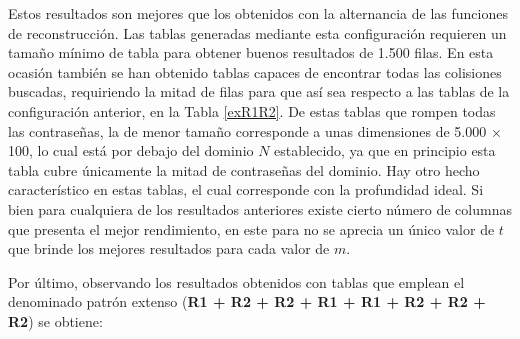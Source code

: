 \documentclass[12pt,spanish,listoffigures,listoftables,listofalgorithms]{tfgetsinf}
\begin{document}
Estos resultados son mejores que los obtenidos con la alternancia de las funciones de reconstrucción. Las tablas generadas mediante esta configuración requieren un tamaño mínimo de tabla para obtener buenos resultados de 1.500 filas. En esta ocasión también se han obtenido tablas capaces de encontrar todas las colisiones buscadas, requiriendo la mitad de filas para que así sea respecto a las tablas de la configuración anterior, en la Tabla \ref{exR1R2}. De estas tablas que rompen todas las contraseñas, la de menor tamaño corresponde a unas dimensiones de 5.000 $\times$ 100, lo cual está por debajo del dominio $N$ establecido, ya que en principio esta tabla cubre únicamente la mitad de contraseñas del dominio. Hay otro hecho característico en estas tablas, el cual corresponde con la profundidad ideal. Si bien para cualquiera de los resultados anteriores existe cierto número de columnas que presenta el mejor rendimiento, en este para no se aprecia un único valor de $t$ que brinde los mejores resultados para cada valor de $m$.

Por último, observando los resultados obtenidos con tablas que emplean el denominado patrón extenso (\textbf{R1 + R2 + R2 + R1 + R1 + R2 + R2 + R2}) se obtiene:
\end{document}
